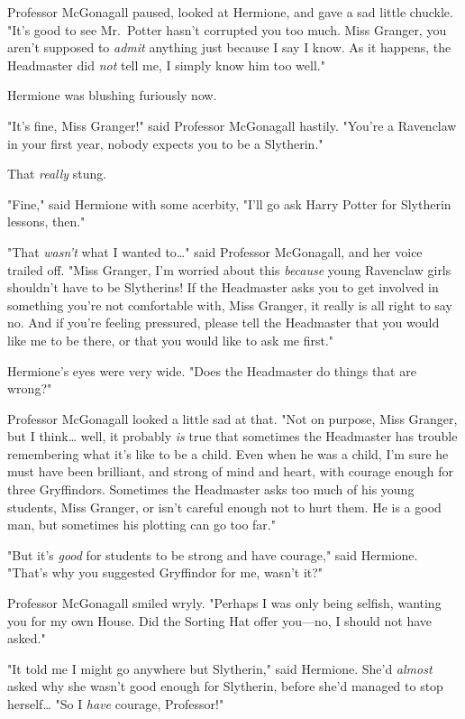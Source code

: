 Professor McGonagall paused, looked at Hermione, and gave a sad little chuckle. 
"It's good to see Mr.~Potter hasn't corrupted you too much. Miss Granger, you 
aren't supposed to \emph{admit} anything just because I say I know. As it 
happens, the Headmaster did \emph{not} tell me, I simply know him too well."

Hermione was blushing furiously now.

"It's fine, Miss Granger!" said Professor McGonagall hastily. "You're a 
Ravenclaw in your first year, nobody expects you to be a Slytherin."

That \emph{really} stung.

"Fine," said Hermione with some acerbity, "I'll go ask Harry Potter for 
Slytherin lessons, then."

"That \emph{wasn't} what I wanted to{\ldots}" said Professor McGonagall, and 
her voice trailed off. "Miss Granger, I'm worried about this \emph{because} 
young Ravenclaw girls shouldn't have to be Slytherins! If the Headmaster asks 
you to get involved in something you're not comfortable with, Miss Granger, it 
really is all right to say no. And if you're feeling pressured, please tell the 
Headmaster that you would like me to be there, or that you would like to ask me 
first."

Hermione's eyes were very wide. "Does the Headmaster do things that are wrong?"

Professor McGonagall looked a little sad at that. "Not on purpose, Miss 
Granger, but I think{\ldots} well, it probably \emph{is} true that sometimes 
the Headmaster has trouble remembering what it's like to be a child. Even when 
he was a child, I'm sure he must have been brilliant, and strong of mind and 
heart, with courage enough for three Gryffindors. Sometimes the Headmaster asks 
too much of his young students, Miss Granger, or isn't careful enough not to 
hurt them. He is a good man, but sometimes his plotting can go too far."

"But it's \emph{good} for students to be strong and have courage," said 
Hermione. "That's why you suggested Gryffindor for me, wasn't it?"

Professor McGonagall smiled wryly. "Perhaps I was only being selfish, wanting 
you for my own House. Did the Sorting Hat offer you---no, I should not have 
asked."

"It told me I might go anywhere but Slytherin," said Hermione. She'd 
\emph{almost} asked why she wasn't good enough for Slytherin, before she'd 
managed to stop herself{\ldots} "So I \emph{have} courage, Professor!"

